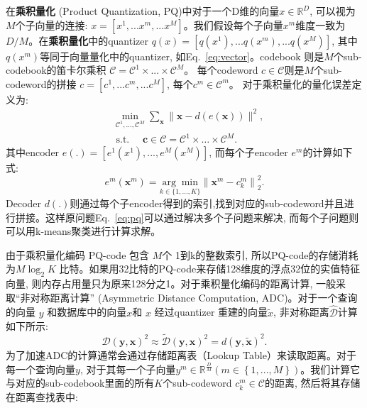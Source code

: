 在\textbf{乘积量化} (Product Quantization, PQ)中对于一个D维的向量$x \in \mathbb{R}^D$, 可以视为$M$个子向量的连接: $x = \left[ x^1,...x^m,...x^M \right]$。我们假设每个子向量$x^m$维度一致为$D/M$。在\textbf{乘积量化}中的quantizer $q(x) = \left[ q(x^1),...q(x^m),...q(x^M) \right]$, 其中 $q(x^m)$等同于向量量化中的quantizer, 如Eq.~\ref{eq:vector}。codebook 则是$M$个sub-codebook的笛卡尔乘积 $\mathcal{C} = \mathcal{C}^1 \times ... \times \mathcal{C}^M$。 每个codeword $c \in \mathcal{C}$则是$M$个sub-codeword的拼接 $c = \left[ c^1,...c^m,...c^M\right]$, 每个$c^m \in \mathcal{C}^m$。 对于乘积量化的量化误差定义为:
\begin{equation}
    \begin{aligned}
        & \min _{\mathcal{C}^1, \ldots, \mathcal{C}^M} \sum_{\mathbf{x}}\|\mathbf{x}-d(e(\mathbf{x}))\|^2, \\
        & \text { s.t. } \quad \mathbf{c} \in \mathcal{C}=\mathcal{C}^1 \times \ldots \times \mathcal{C}^M .
        \label{eq:pq}
        \end{aligned}
\end{equation}
其中encoder $e(.) = \left[ e^1(x^1) ,..., e^M(x^M)\right]$, 而每个子encoder $e^m$的计算如下式:
\begin{equation}
    e^m\left(\mathbf{x}^m\right)=\underset{k \in\{1, \ldots, K\}}{\arg \min }\left\|\mathbf{x}^m-c_k^m\right\|_2^2.
\end{equation}
Decoder $d(.)$则通过每个子encoder得到的索引,找到对应的sub-codeword并且进行拼接。这样原问题Eq.~\ref{eq:pq}可以通过解决多个子问题来解决, 而每个子问题则可以用k-means聚类进行计算求解。 \par
由于乘积量化编码 PQ-code 包含 $M$个 1到k的整数索引, 所以PQ-code的存储消耗为$M\log_2K$ 比特。如果用32比特的PQ-code来存储128维度的浮点32位的实值特征向量, 则内存占用量只为原来128分之1。对于乘积量化编码的距离计算, 一般采取``非对称距离计算'' (Asymmetric Distance Computation, ADC)。对于一个查询的向量 $y$ 和数据库中的向量$x$和 $x$ 经过quantizer 重建的向量$\tilde{x}$, 非对称距离$\hat{\mathcal{D}}$计算如下所示:
\begin{equation}
    \mathcal{D}(\mathbf{y}, \mathbf{x})^2 \approx \tilde{\mathcal{D}}(\mathbf{y}, \mathbf{x})^2=d(\mathbf{y}, \tilde{\mathbf{x}})^2.
\end{equation}
为了加速ADC的计算通常会通过存储距离表（Lookup Table）来读取距离。对于每一个查询向量$y$, 对于其每一个子向量$y^m \in \mathbb{R}^{\frac{D}{M}} (m \in \left \{ 1,...,M  \right \})$。我们计算它与对应的sub-codebook里面的所有$K$个sub-codeword $c_k^m \in \mathcal{C}$的距离, 然后将其存储在距离查找表中:
